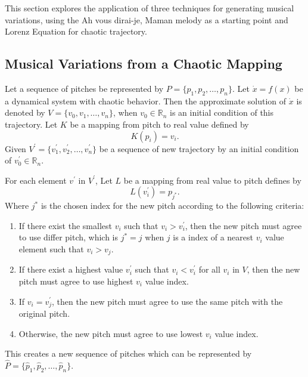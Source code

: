 \documentclass[11pt]{article}
\begin{document}
This section explores the application of three techniques for generating musical variations, using the Ah vous dirai-je, Maman melody as a starting point and Lorenz Equation for chaotic
trajectory.

\subsection{Musical Variations from a Chaotic Mapping}

Let a sequence of pitches be represented by $P = \{p_1, p_2, \dots, p_n\}$. Let $\dot{x} = f(x)$ be a dynamical system with chaotic behavior. Then the approximate solution of $\dot{x}$ is denoted by $V = \{v_0, v_1, \dots, v_n\}$, when $v_0 \in \mathbb{R}_n$ is an initial condition of this trajectory. Let $K$ be a mapping from pitch to real value defined by 
$$K(p_i) = v_i.$$ 
Given $V^\prime = \{ v^\prime_1, v^\prime_2, \dots, v^\prime_n \}$ be a sequence of new trajectory by an initial condition of $v^\prime_0 \in \mathbb{R}_n$.

For each element $v^\prime$ in $V^\prime$, Let $L$ be a mapping from real value to pitch defines by 
$$L(v^\prime_i) = p_{j^*}.$$ 
Where $j^*$ is the chosen index for the new pitch according to the following criteria:
\begin{enumerate}
	\item If there exist the smallest $v_i$ such that $v_i > v^\prime_i$, then the new pitch must agree to use differ pitch, which is $j^* = j$ when $j$ is a index of a nearest $v_i$ value element such that $v_i > v_j$.
	\item If there exist a highest value $v^\prime_i$ such that $v_i < v^\prime_i$ for all $v_i$ in $V$, then the new pitch must agree to use highest $v_i$ value index. 
	\item If $v_i = v^\prime_j$, then the new pitch must agree to use the same pitch with the original pitch. 
	\item Otherwise, the new pitch must agree to use lowest $v_i$ value index.
\end{enumerate}
This creates a new sequence of pitches which can be represented by $\hat{P} =\{ \hat{p}_1, \hat{p}_2, \dots, \hat{p}_n \}$.
\end{document}
